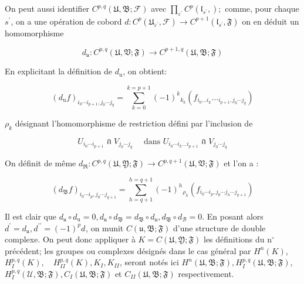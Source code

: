 On peut aussi identifier $C^{p, q}(\mathfrak{U}, \mathfrak{B} ; \mathcal{F})$ avec $\prod_{\varepsilon^{\prime}} C^{p}\left(\mathfrak{l}_{s^{\prime}}, \mathscr{}\right) ;$ comme, pour chaque $s^{\prime}$, on a une opération de cobord $d: C^{p}\left(\mathfrak{U}_{\varepsilon^{\prime}}, \mathcal{F}\right) \rightarrow C^{p+1}\left(\mathfrak{l}_{s^{\prime}}, \mathfrak{F}\right)$ on en déduit un homomorphisme

$$
d_{\mathfrak{u}}: C^{p, q}(\mathfrak{U}, \mathfrak{V} ; \mathfrak{F}) \rightarrow C^{p+1, q}(\mathfrak{U}, \mathfrak{B} ; \mathfrak{F})
$$

En explicitant la définition de $d_{\mathrm{u}}$, on obtient:

$$
\left(d_{\mathrm{u}} f\right)_{i_{0} \cdots i_{p+1}, j_{0} \cdots j_{q}}=\sum_{k=0}^{k=p+1}(-1)^{k}{ }_{k_{k}}\left(f_{i_{0} \ldots i_{k}} \ldots_{i_{p+1}, j_{0} \cdots j_{q}}\right)
$$

$\rho_{k}$ désignant l'homomorphisme de restriction défini par l'inclusion de

$$
U_{i_{0} \cdots i_{p+1}} \text { ก } V_{j_{0} \cdots j_{q}} \quad \text { dans } U_{i_{0} \cdots i_{k} \ldots i_{p+1}} \text { ก } V_{j_{0} \cdots j_{q}}
$$

On définit de même $d_{\mathfrak{\Re}}: C^{p, q}(\mathfrak{U}, \mathfrak{Y} ; \mathfrak{F}) \rightarrow C^{p, q+1}(\mathfrak{U}, \mathfrak{V} ; \mathfrak{F})$ et l'on a :

$$
\left(d_{\mathfrak{B}} f\right)_{i_{0} \cdots i_{p}, j_{0} \cdots j_{q+1}}=\sum_{h=q+1}^{h=q+1}(-1)^{h}{ }_{\rho_{h}}\left(f_{i_{0} \cdots i_{p}, j_{0} \cdots j_{h} \cdots j_{q+1}}\right)
$$

Il est clair que $d_{\mathfrak{u}} \circ d_{\mathrm{u}}=0, d_{\mathfrak{u}} \circ d_{\mathfrak{B}}=d_{\mathfrak{B}} \circ d_{\mathfrak{u}}, d_{\mathfrak{B}} \circ d_{\mathcal{B}}=0$. En posant alors $d^{\prime}=d_{\mathfrak{u}}, d^{\prime \prime}=(-1)^{p} d_{\mathfrak{}}$, on munit $C(\mathfrak{u}, \mathfrak{B} ; \mathfrak{F})$ d'une structure de double complexe. On peut donc appliquer à $K=C(\mathfrak{U}, \mathfrak{Y} ; \mathfrak{F})$ les définitions du $\mathrm{n}^{\circ}$ précédent; les groupes ou complexes désignés dans le cas général par $H^{n}(K)$, $H_{I}^{p, q}(K), \quad H_{I I}^{p, q}(K), K_{I}, K_{I I}$, seront notés ici $H^{n}(\mathfrak{U}, \mathfrak{B} ; \mathfrak{F}), H_{I}^{p, q}(\mathfrak{U}, \mathfrak{B} ; \mathfrak{F})$, $H_{I}^{p, q}(\mathcal{U}, \mathfrak{B} ; \mathfrak{F}), C_{I}(\mathfrak{U}, \mathfrak{B} ; \mathfrak{F})$ et $C_{I I}(\mathfrak{U}, \mathfrak{B} ; \mathfrak{F})$ respectivement.

